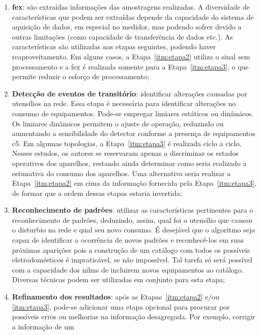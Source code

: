 \begin{enumerate}[label={Etapa} \arabic* - ,ref=\arabic*,align=left]
\item\label{itm:etapa1} \textbf{\gls{fex}}: são extraídas
informações das amostragens realizadas. A diversidade de
características que podem ser extraídas depende da capacidade do
sistema de aquisição de dados, em especial no medidor, mas podendo
sofrer devido a outras limitações (como capacidade de transferência de
dados etc.). As características são utilizadas nas etapas seguintes, podendo
haver reaproveitamento. Em alguns casos, a Etapa~\ref{itm:etapa2}
utiliza o sinal sem processamento e a \gls{fex} é realizada somente
para a Etapa~\ref{itm:etapa3}, o que permite reduzir o esforço de
processamento;
\item\label{itm:etapa2}\textbf{Detecção de eventos de transitório}:
identificar alterações causadas por utensílios na rede.  Essa etapa é
necessária para identificar alterações no consumo de equipamentos.
Pode-se empregar limiares estáticos ou dinâmicos. Os limiares
dinâmicos permitem o ajuste de operação, reduzindo ou aumentando a
sensibilidade do detector conforme a presença de equipamentos
\acs{c5}. Em algumas topologias, a Etapa~\ref{itm:etapa3} é
realizada ciclo a ciclo. Nesses estudos, os autores se reservaram
apenas a discriminar os estados operativos dos aparelhos, restando
ainda determinar como seria realizado a estimativa do consumo dos
aparelhos. Uma alternativa seria realizar a Etapa~\ref{itm:etapa2} em
cima da informação fornecida pela Etapa~\ref{itm:etapa3}, de formar
que a ordem dessas etapas estaria invertida;
\item\label{itm:etapa3}\textbf{Reconhecimento de padrões}: utilizar as
características pertinentes para o reconhecimento de padrões,
deduzindo, assim, qual foi o utensílio que causou o disturbio na rede
e qual seu novo consumo. É desejável que o algoritmo seja capaz de identificar
a ocorrência de novos padrões e reconhecê-los em suas próximas 
aparições pois a construção de um catálogo com todos os possíveis
eletrodomésticos é impraticável, se não impossível. Tal tarefa só será
possível com a capacidade dos \glspl{nilm} de incluirem novos
equipamentos ao catálogo. Diversas técnicas podem ser utilizadas em
conjunto para esta etapa;
\item\label{itm:etapa4}\textbf{Refinamento dos resultados}: após as
Etapas~\ref{itm:etapa2} e/ou \ref{itm:etapa3}, pode-se adicionar uma
etapa opcional para procurar por possíveis erros ou melhorias na
informação desagregada. Por exemplo, corrigir a informação de um

\end{enumerate}

